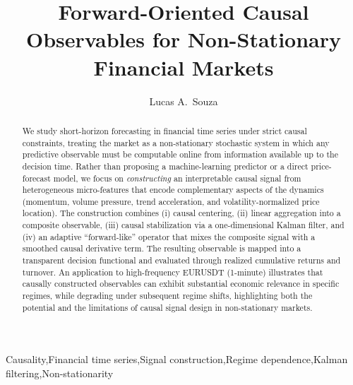 \documentclass[final,5p,times,twocolumn]{elsarticle}
\begin{document}
\begin{frontmatter} 

\title{Forward-Oriented Causal Observables for Non-Stationary Financial Markets}
 

\author[aff1]{Lucas A.~Souza}


\begin{abstract}
We study short-horizon forecasting in financial time series under strict causal constraints, treating the market as a non-stationary stochastic system in which any predictive observable must be computable online from information available up to the decision time.
Rather than proposing a machine-learning predictor or a direct price-forecast model, we focus on \emph{constructing} an interpretable causal signal from heterogeneous micro-features that encode complementary aspects of the dynamics (momentum, volume pressure, trend acceleration, and volatility-normalized price location).
The construction combines (i) causal centering, (ii) linear aggregation into a composite observable, (iii) causal stabilization via a one-dimensional Kalman filter, and (iv) an adaptive ``forward-like'' operator that mixes the composite signal with a smoothed causal derivative term.
The resulting observable is mapped into a transparent decision functional and evaluated through realized cumulative returns and turnover.
An application to high-frequency EURUSDT (1-minute) illustrates that causally constructed observables can exhibit substantial economic relevance in specific regimes, while degrading under subsequent regime shifts, highlighting both the potential and the limitations of causal signal design in non-stationary markets.
\end{abstract}



\begin{keyword}
Causality\sep Financial time series\sep Signal construction\sep Regime dependence\sep Kalman filtering\sep Non-stationarity



\end{keyword}


\end{frontmatter}
\end{document}
